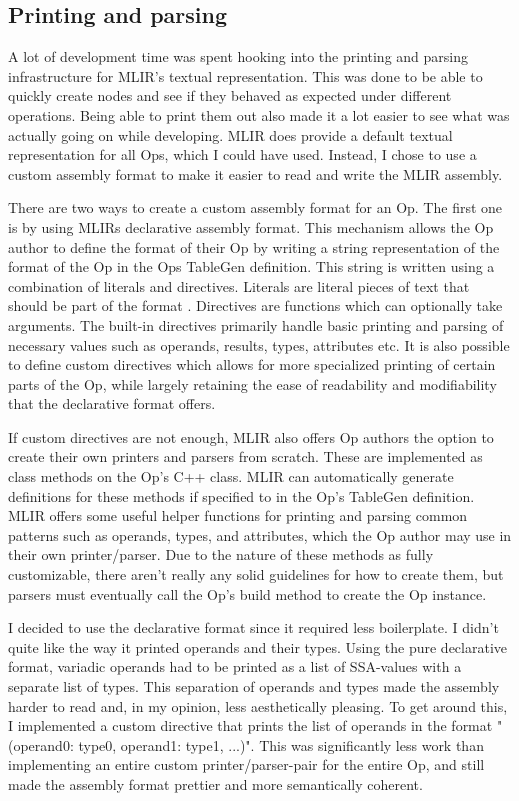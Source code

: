 \subsection{Printing and parsing}
A lot of development time was spent hooking into the printing and parsing infrastructure for MLIR's textual representation. This was done to be able to quickly create nodes and see if they behaved as expected under different operations. Being able to print them out also made it a lot easier to see what was actually going on while developing. MLIR does provide a default textual representation for all Ops, which I could have used. Instead, I chose to use a custom assembly format to make it easier to read and write the MLIR assembly. 

There are two ways to create a custom assembly format for an Op. The first one is by using MLIRs declarative assembly format. This mechanism allows the Op author to define the format of their Op by writing a string representation of the format of the Op in the Ops TableGen definition. This string is written using a combination of literals and directives. Literals are literal pieces of text that should be part of the format \cite{mlir_declarative_assembly_format}. Directives are functions which can optionally take arguments. The built-in directives primarily handle basic printing and parsing of necessary values such as operands, results, types, attributes etc. It is also possible to define custom directives which allows for more specialized printing of certain parts of the Op, while largely retaining the ease of readability and modifiability that the declarative format offers.

If custom directives are not enough, MLIR also offers Op authors the option to create their own printers and parsers from scratch. These are implemented as class methods on the Op's C++ class. MLIR can automatically generate definitions for these methods if specified to in the Op's TableGen definition. MLIR offers some useful helper functions for printing and parsing common patterns such as operands, types, and attributes, which the Op author may use in their own printer/parser. Due to the nature of these methods as fully customizable, there aren't really any solid guidelines for how to create them, but parsers must eventually call the Op's build method to create the Op instance.

I decided to use the declarative format since it required less boilerplate. I didn't quite like the way it printed operands and their types. Using the pure declarative format, variadic operands had to be printed as a list of SSA-values with a separate list of types. This separation of operands and types made the assembly harder to read and, in my opinion, less aesthetically pleasing. To get around this, I implemented a custom directive that prints the list of operands in the format "(operand0: type0, operand1: type1, ...)". This was significantly less work than implementing an entire custom printer/parser-pair for the entire Op, and still made the assembly format prettier and more semantically coherent.

